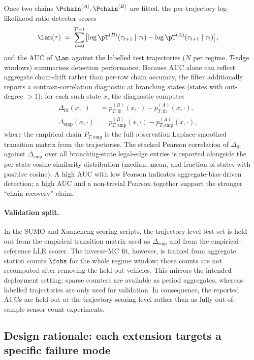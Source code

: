 Once two chains $\Pchain^{(A)}, \Pchain^{(B)}$ are fitted, the
per-trajectory log-likelihood-ratio detector scores
\[
\Lam(\tau) \;=\; \sum_{t=0}^{T-1}\bigl[\log\pT^{(B)}(\tau_{t+1}\mid\tau_t) - \log\pT^{(A)}(\tau_{t+1}\mid\tau_t)\bigr],
\]
and the AUC of $\Lam$ against the labelled test trajectories
($N$ per regime, $T$-edge windows) summarises detection performance.
Because AUC alone can reflect aggregate chain-drift rather than per-row
chain accuracy, the filter additionally reports
a contrast-correlation diagnostic at branching states (states
with out-degree $> 1$): for each such state $x$, the diagnostic computes
\[
\begin{aligned}
\Delta_{\mathrm{fit}}(x, \cdot) &= p^{(B)}_{T,\mathrm{fit}}(x, \cdot) - p^{(A)}_{T,\mathrm{fit}}(x, \cdot), \\
\Delta_{\mathrm{emp}}(x, \cdot) &= p^{(B)}_{T,\mathrm{emp}}(x, \cdot) - p^{(A)}_{T,\mathrm{emp}}(x, \cdot),
\end{aligned}
\]
where the empirical chain $P_{T,\mathrm{emp}}$ is the
full-observation Laplace-smoothed transition matrix from the trajectories.
The stacked Pearson correlation of $\Delta_{\mathrm{fit}}$
against $\Delta_{\mathrm{emp}}$ over all branching-state legal-edge entries
is reported alongside the per-state cosine similarity distribution
(median, mean, and
fraction of states with positive cosine). A high AUC with low Pearson
indicates aggregate-bias-driven detection; a high AUC and a
non-trivial Pearson together support the stronger ``chain recovery''
claim.

\paragraph{Validation split.} In the SUMO and Xuancheng scoring scripts,
the trajectory-level test set is held out from the empirical transition
matrix used as $\Delta_{\mathrm{emp}}$ and from the empirical-reference
LLR scorer. The inverse-MC fit, however, is trained from aggregate station
counts $\fobs$ for the whole regime window; those counts are not recomputed
after removing the held-out vehicles. This mirrors the intended deployment
setting: sparse counters are available as period aggregates, whereas
labelled trajectories are only used for validation. In consequence, the
reported AUCs are held out at the trajectory-scoring level rather
than as fully out-of-sample sensor-count experiments.

\subsection{Design rationale: each extension targets a specific failure mode}
\label{sec:design-rationale}

